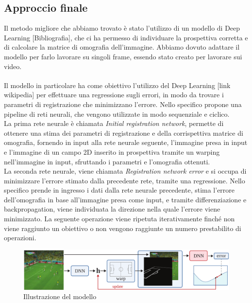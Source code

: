 \documentclass{article}
\begin{document}
\subsection{Approccio finale}
Il metodo migliore che abbiamo trovato è stato l'utilizzo di un modello di Deep Learning [Bibliografia], che ci ha permesso di individuare la prospettiva corretta e di calcolare la matrice di omografia dell'immagine. Abbiamo dovuto adattare il modello per farlo lavorare su singoli frame, essendo stato creato per lavorare sui video.
\\ \\
Il modello in particolare ha come obiettivo l'utilizzo del Deep Learning [link wikipedia] per effettuare una regressione sugli errori, in modo da trovare i parametri di registrazione che minimizzano l'errore. Nello specifico propone una pipeline di reti neurali, che vengono utilizzate in modo sequenziale e ciclico. 
\\La prima rete neurale è chiamata \textit{Initial registration network}, permette di ottenere una stima dei parametri di registrazione e della corrispettiva matrice di omografia, fornendo in input alla rete neurale seguente, l'immagine presa in input e l'immagine di un campo 2D inserito in prospettiva tramite un warping nell'immagine in input, sfruttando i parametri e l'omografia ottenuti. 
\\La seconda rete neurale, viene chiamata \textit{Registration network error} e si occupa di minimizzare l'errore stimato dalla precedente rete, tramite una regressione. Nello specifico prende in ingresso i dati dalla rete neurale precedente, stima l'errore dell'omografia in base all'immagine presa come input, e tramite differenziazione e backpropagation, viene individuata la direzione nella quale l'errore viene minimizzato. La seguente operazione viene ripetuta iterativamente finché non viene raggiunto un obiettivo o non vengono raggiunte un numero prestabilito di operazioni.

\begin{figure}[h]
    \centering
    \includegraphics[width=1\linewidth]{capitoli/reteNeurale.png}
    \caption{Illustrazione del modello}
    \label{fig:enter-label}
\end{figure}
\end{document}
